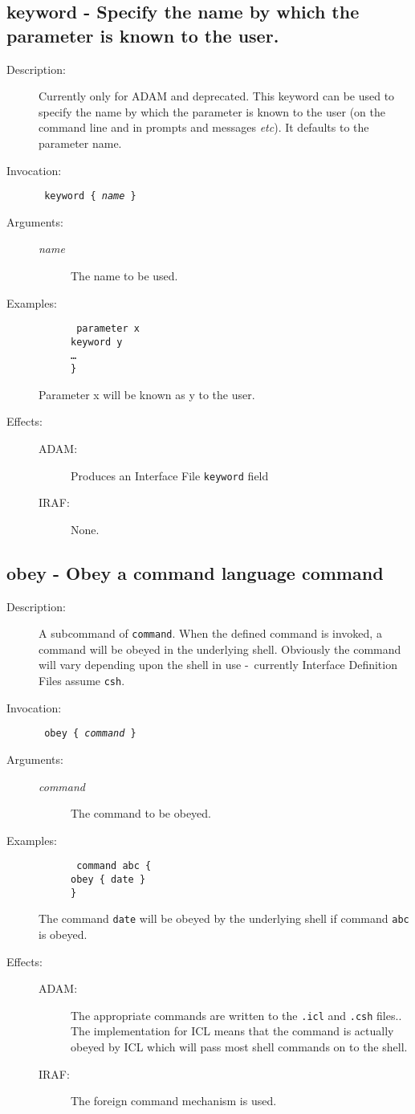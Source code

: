 \documentclass[twoside,11pt]{article}
\newcommand{\htmlref}[2]{#1}
\newcommand{\xlabel}[1]{}
\newcommand{\dash}{--}
\newcommand{\tab}{\>}
\renewcommand{\dash}{-}
\renewcommand{\tab}{   }
\newlength{\sstbannerlength}
\newlength{\sstcaptionlength}
\newlength{\sstexampleslength}
\newlength{\sstexampleswidth}
\newcommand{\sstroutine}[3]{
   \goodbreak
   \rule{\textwidth}{0.5mm}
   \vspace{-7ex}
   \newline
   \settowidth{\sstbannerlength}{{\Large {\bf #1}}}
   \setlength{\sstcaptionlength}{\textwidth}
   \setlength{\sstexampleslength}{\textwidth}
   \addtolength{\sstbannerlength}{0.5em}
   \addtolength{\sstcaptionlength}{-2.0\sstbannerlength}
   \addtolength{\sstcaptionlength}{-5.0pt}
   \settowidth{\sstexampleswidth}{{\bf Examples:}}
   \addtolength{\sstexampleslength}{-\sstexampleswidth}
   \parbox[t]{\sstbannerlength}{\flushleft{\Large {\bf #1}}}
   \parbox[t]{\sstcaptionlength}{\center{\Large #2}}
   \parbox[t]{\sstbannerlength}{\flushright{\Large {\bf #1}}}
   \begin{description}
      #3
   \end{description}
}
\newcommand{\sstdescription}[1]{\item[Description:] #1}
\newcommand{\sstinvocation}[1]{\item[Invocation:]\hspace{0.4em}{\tt #1}}
\newcommand{\ssteffects}[1]{
   \item[Effects:] \mbox{} \\
   \vspace{-3.5ex}
   \begin{description}
      #1
   \end{description}
}
\newcommand{\sstarguments}[1]{
   \item[Arguments:] \mbox{} \\
   \vspace{-3.5ex}
   \begin{description}
      #1
   \end{description}
}
\newcommand{\sstexamples}[1]{
   \item[Examples:] \mbox{}
      #1
}
\newcommand{\sstsubsection}[1]{ \item[{#1}] \mbox{} \\}
\newcommand{\sstexamplesubsection}[2]
{   \vspace{-5ex}
\begin{quote} \texttt{\begin{tabbing}
xxx\=xxx\=\kill
#1
\end{tabbing}}
\end{quote}
#2}
\newcommand{\ssttt}{\tt}
\renewcommand{\sstroutine}[3]{
      \subsection{#1\xlabel{#1}-\label{#1}#2}
      \begin{description}
         #3
      \end{description}
   }
\renewcommand{\sstdescription}[1]{\item[Description:]
      \begin{description}
         #1
      \end{description}
   }
\renewcommand{\sstinvocation}[1]{\item[Invocation:]
      \begin{description}
         {\ssttt #1}
      \end{description}
   }
\renewcommand{\ssteffects}[1]{
      \item[Effects:]
      \begin{description}
         #1
      \end{description}
   }
\renewcommand{\sstarguments}[1]{
      \item[Arguments:]
      \begin{description}
         #1
      \end{description}
   }
\renewcommand{\sstexamples}[1]{
      \item[Examples:]
      \begin{description}
         #1
      \end{description}
   }
\renewcommand{\sstsubsection}[1]{\item[{#1}]}
\renewcommand{\sstexamplesubsection}[2]{\item[] {\ssttt #1} \\ \item[#2]}
\begin{document}
\sstroutine{
   keyword
}{
   Specify the name by which the parameter is known to the user.
}{
   \sstdescription{
      Currently only for ADAM and deprecated. This keyword can be used to
      specify the name by which the parameter is known to the user
      (on the command line and in prompts and messages \emph{etc}).
      It defaults to the parameter name.
   }
   \sstinvocation{
      keyword \{ \textit{name} \}
   }
   \sstarguments{
      \sstsubsection{
         \textit{name}
      }{
         The name to be used.
      }
   }
   \sstexamples{
      \sstexamplesubsection{
         parameter x\\
         \tab keyword y\\
         \tab \ldots\\
         \}
      }{
         Parameter x will be known as y to the user.
      }
   }
   \ssteffects{
      \sstsubsection{ADAM:}
         {Produces an Interface File \texttt{keyword} field}
      \sstsubsection{IRAF:}{None.}
   }
}

\sstroutine{
   obey
}{
   Obey a command language command
}{
   \sstdescription{
      A subcommand of
      \htmlref{\texttt{command}}{command}.
      When the defined command is invoked, a command will be obeyed in the 
      underlying shell.  Obviously the command will vary depending upon the
      shell in use \dash\ currently Interface Definition Files assume
      \texttt{csh}.
   }
   \sstinvocation{
      obey \{ \textit{command} \}
   }
   \sstarguments{
      \sstsubsection{
         \textit{command}
      }{
         The command to be obeyed.
      }
   }
   \sstexamples{
      \sstexamplesubsection{
         command abc \{\\
         \tab obey \{ date \}\\
         \}
      }{
         The command {\ssttt date} will be obeyed by the underlying
         shell if command {\ssttt abc} is obeyed.
      }
   }
   \ssteffects{
      \sstsubsection{ADAM:}
         {The appropriate commands are written to the \texttt{.icl} and 
          \texttt{.csh} files.}. The implementation for ICL means that the
          command is actually obeyed by ICL which will pass most shell commands
          on to the shell.
      \sstsubsection{IRAF:}{The foreign command mechanism is used.}
   }
}
\end{document}
